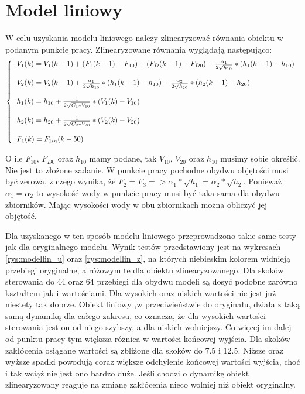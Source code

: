 	\section{Model liniowy}
		\label{sec:model_lin}
		W celu uzyskania modelu liniowego należy zlinearyzować równania obiektu w podanym punkcie pracy. Zlinearyzowane równania wyglądają następująco:
		\begin{equation}
			\left\{
			\begin{tabular}{l}
				$V_1(k) =V_1(k-1) + (F_1(k-1)-F_{10}) + (F_D(k-1)-F_{D0}) -\frac{\alpha_1}{2\sqrt{h_{10}}}*(h_1(k-1)-h_{10}) $ \\\\
				$V_2(k) = V_2(k-1)+\frac{\alpha_1}{2\sqrt{h_{10}}}*(h_1(k-1)-h_{10}) - \frac{\alpha_2}{2\sqrt{h_{20}}}*(h_2(k-1)-h_{20})$\\\\
				$h_1(k) = h_{10}+\frac{1}{2\sqrt{C_1*V_{10}}}*(V_1(k)-V_{10})$\\\\
				$h_2(k) = h_{20}+\frac{1}{2\sqrt{C_2*V_{20}}}*(V_2(k)-V_{20})$\\\\
				$F_1(k) = F_{1in}(k-50)$
			\end{tabular}
			\right.
			\label{eq:lin}
		\end{equation}
		
		O ile $F_{10}$, $F_{D0}$ oraz $h_{10}$ mamy podane, tak $V_{10}$, $V_{20}$ oraz $h_{10}$ musimy sobie określić. Nie jest to złożone zadanie. W punkcie pracy pochodne obydwu objętości musi być zerowa, z czego wynika, że $F_2 = F_3 => \alpha_1*\sqrt{h_1} = \alpha_2*\sqrt{h_2}$. Ponieważ $\alpha_1 = \alpha_2$ to wysokość wody w punkcie pracy musi być taka sama dla obydwu zbiorników. Mając wysokości wody w obu zbiornikach można obliczyć jej objętość.
		
		Dla uzyskanego w ten sposób modelu liniowego przeprowadzono takie same testy jak dla oryginalnego modelu. Wynik testów przedstawiony jest na wykresach \ref{rys:modellin_u} oraz \ref{rys:modellin_z}, na których niebieskim kolorem widnieją przebiegi oryginalne, a różowym te dla obiektu zlinearyzowanego. Dla skoków sterowania do 44 oraz 64 przebiegi dla obydwu modeli są dosyć podobne zarówno kształtem jak i wartościami. Dla wysokich oraz niskich wartości nie jest już niestety tak dobrze. Obiekt liniowy ,w przeciwieństwie do oryginału, działa z taką samą dynamiką dla całego zakresu, co oznacza, że dla wysokich wartości sterowania jest on od niego szybszy, a dla niskich wolniejszy. Co więcej im dalej od punktu pracy tym większa różnica w wartości końcowej wyjścia. Dla skoków zakłócenia osiągane wartości są zbliżone dla skoków do 7.5 i 12.5. Niższe oraz wyższe spadki powodują coraz większe odchylenie końcowej wartości wyjścia, choć i tak wciąż nie jest ono bardzo duże. Jeśli chodzi o dynamikę obiekt zlinearyzowany reaguje na zmianę zakłócenia nieco wolniej niż obiekt oryginalny.
		
